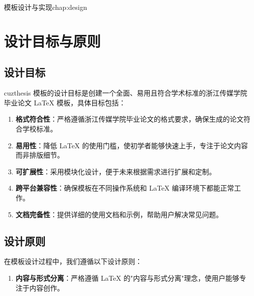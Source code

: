 \begin{cuzchapter}{模板设计与实现}{chap:design}


	\section{设计目标与原则}\label{sec:design-goals}
	
	\subsection{设计目标}
	
	cuzthesis 模板的设计目标是创建一个全面、易用且符合学术标准的浙江传媒学院毕业论文 LaTeX 模板，具体目标包括：
	
	\begin{enumerate}
		\item \textbf{格式符合性}：严格遵循浙江传媒学院毕业论文的格式要求，确保生成的论文符合学校标准。
		
		\item \textbf{易用性}：降低 LaTeX 的使用门槛，使初学者能够快速上手，专注于论文内容而非排版细节。
		
		\item \textbf{可扩展性}：采用模块化设计，便于未来根据需求进行扩展和定制。
		
		\item \textbf{跨平台兼容性}：确保模板在不同操作系统和 LaTeX 编译环境下都能正常工作。
		
		\item \textbf{文档完备性}：提供详细的使用文档和示例，帮助用户解决常见问题。
	\end{enumerate}
	
	\subsection{设计原则}
	
	在模板设计过程中，我们遵循以下设计原则：
	
	\begin{enumerate}
		\item \textbf{内容与形式分离}：严格遵循 LaTeX 的"内容与形式分离"理念，使用户能够专注于内容创作。
		

\end{enumerate}
\end{cuzchapter}
